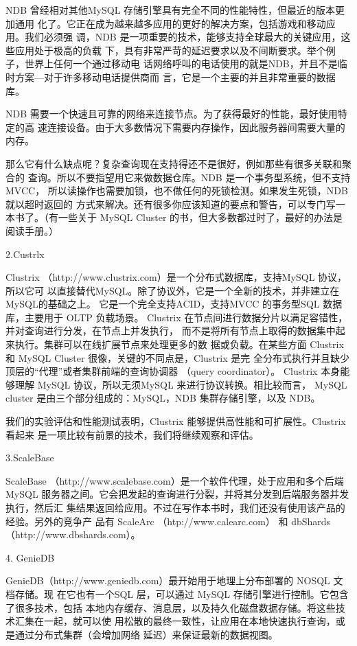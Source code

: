 NDB 曾经相对其他MySQL 存储引擎具有完全不同的性能特性，但最近的版本更加通用
化了。它正在成为越来越多应用的更好的解决方案，包括游戏和移动应用。我们必须强
调，NDB 是一项重要的技术，能够支持全球最大的关键应用，这些应用处于极高的负载
下，具有非常严苛的延迟要求以及不间断要求。举个例子，世界上任何一个通过移动电
话网络呼叫的电话使用的就是NDB，并且不是临时方案—对于许多移动电话提供商而
言，它是一个主要的并且非常重要的数据库。

NDB 需要一个快速且可靠的网络来连接节点。为了获得最好的性能，最好使用特定的高
速连接设备。由于大多数情况下需要内存操作，因此服务器间需要大量的内存。

那么它有什么缺点呢？复杂查询现在支持得还不是很好，例如那些有很多关联和聚合的
查询。所以不要指望用它来做数据仓库。NDB 是一个事务型系统，但不支持MVCC，
所以读操作也需要加锁，也不做任何的死锁检测。如果发生死锁，NDB 就以超时返回的
方式来解决。还有很多你应该知道的要点和警告，可以专门写一本书了。（有一些关于
MySQL Cluster 的书，但大多数都过时了，最好的办法是阅读手册。）

2.Custrlx

Clustrix （http://www.clustrix.com）是一个分布式数据库，支持MySQL 协议，所以它可
以直接替代MySQL。除了协议外，它是一个全新的技术，并非建立在 MySQL的基础之上。
它是一个完全支持ACID，支持MVCC 的事务型SQL 数据库，主要用于 OLTP 负载场景。
Clustrix 在节点间进行数据分片以满足容错性，并对查询进行分发，在节点上并发执行，
而不是将所有节点上取得的数据集中起来执行。集群可以在线扩展节点来处理更多的数
据或负载。在某些方面 Clustrix 和 MySQL Cluster 很像，关键的不同点是，Clustrix 是完
全分布式执行并且缺少顶层的“代理”或者集群前端的查询协调器 （query coordinator）。
Clustrix 本身能够理解 MySQL 协议，所以无须MySQL 来进行协议转换。相比较而言，
MySQL cluster 是由三个部分组成的：MySQL，NDB 集群存储引擎，以及 NDB。

我们的实验评估和性能测试表明，Clustrix 能够提供高性能和可扩展性。Clustrix 看起来
是一项比较有前景的技术，我们将继续观察和评估。

3.ScaleBase

ScaleBase （http://www.scalebase.com）是一个软件代理，处于应用和多个后端MySQL
服务器之间。它会把发起的查询进行分裂，并将其分发到后端服务器并发执行，然后汇
集结果返回给应用。不过在写作本书时，我们还没有使用该产品的经验。另外的竞争产
品有 ScaleArc （htp://www.calearc.com） 和 dbShards （http://www.dbshards.com）。

4. GenieDB

GenieDB（http://www.geniedb.com）最开始用于地理上分布部署的 NOSQL 文档存储。现
在它也有一个SQL 层，可以通过 MySQL 存储引擎进行控制。它包含了很多技术，包括
本地内存缓存、消息层，以及持久化磁盘数据存储。将这些技术汇集在一起，就可以使
用松散的最终一致性，让应用在本地快速执行查询，或是通过分布式集群（会增加网络
延迟）来保证最新的数据视图。

